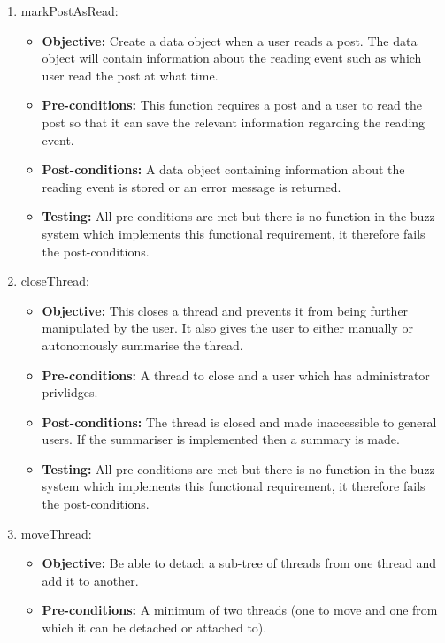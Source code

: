 \begin{enumerate}
\item markPostAsRead:
	\begin{itemize}
		\item\textbf{Objective: } Create a data object when a user reads a post. The data object will contain information about the reading event such as which user read the post at what time.
		\item\textbf{Pre-conditions: } This function requires a post and a user to read the post so that it can save the relevant information regarding the reading event.
		\item\textbf{Post-conditions: } A data object containing information about the reading event is stored or an error message is returned.
		\item\textbf{Testing: } All pre-conditions are met but there is no function in the buzz system which implements this functional requirement, it therefore fails the post-conditions.
	\end{itemize}
\item closeThread:
	\begin{itemize}
		\item\textbf{Objective: }This closes a thread and prevents it from being further manipulated by the user. It also gives the user to either manually or autonomously summarise the thread.
		\item\textbf{Pre-conditions: } A thread to close and a user which has administrator privlidges.
		\item\textbf{Post-conditions: } The thread is closed and made inaccessible  to general users. If the summariser is implemented then a summary is made.
		\item\textbf{Testing: } All pre-conditions are met but there is no function in the buzz system which implements this functional requirement, it therefore fails the post-conditions.
	\end{itemize}
\item moveThread:
	\begin{itemize}
		\item\textbf{Objective: }  Be able to detach a sub-tree of threads from one thread and add it to another.
		\item\textbf{Pre-conditions: } A minimum of two threads (one to move and one from which it can be detached or attached to).

\end{itemize}
\end{enumerate}
